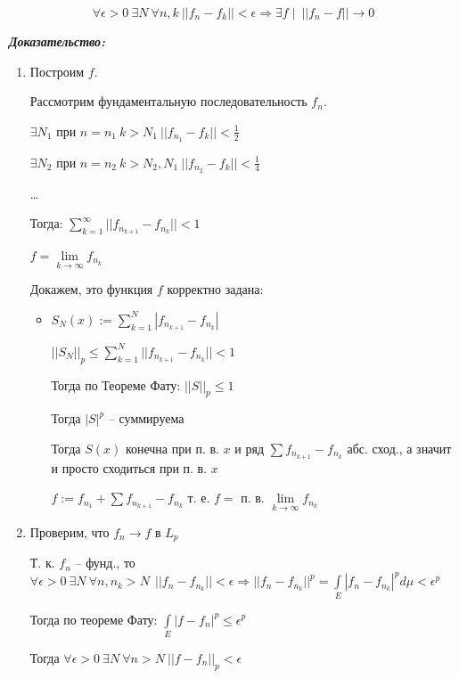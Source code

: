 \documentclass[paper=a4, fontsize=17pt]{article}
\begin{document}
$$ \forall \epsilon > 0 ~ \exists N ~ \forall n, k ~ ||f_n - f_k|| < \epsilon \Rightarrow \exists f \mid ~ ||f_n - f|| \rightarrow 0 $$


\textbf{\emph{Доказательство:}}

\begin{enumerate}
	\item Построим $ f $.

	Рассмотрим фундаментальную последовательность $ f_n $.

	$ \exists N_1 $ при $ n = n_1 ~ k > N_1 ~ ||f_{n_1} - f_k|| < \frac{1}{2}$

	$ \exists N_2 $ при $ n = n_2 ~ k > N_2, N_1 ~ ||f_{n_2} - f_k|| < \frac{1}{4}$

	\dots

	Тогда: $ \sum_{k = 1}^{\infty} || f_{n_{k+1}} - f_{n_k} || < 1$

	$ f = \lim\limits_{k \rightarrow \infty} f_{n_k}$

	Докажем, это функция $ f $ корректно задана:
	\begin{itemize}
		\item
		$ S_N (x) := \sum_{k = 1}^{N}|f_{n_{k+1}} - f_{n_k}|$

		$ ||S_N||_p \leq \sum_{k = 1}^{N} || f_{n_{k+1}} - f_{n_k} || < 1$

		Тогда по Теореме Фату: $ ||S||_p \leq 1 $

		Тогда $ |S|^p $ -- суммируема

		Тогда $ S(x) $ конечна при п. в. $ x $  и ряд $ \sum f_{n_{k + 1}} - f_{n_k} $ абс. сход., а значит  и просто сходиться при п. в. $ x $

		$ f:= f_{n_1} +  \sum f_{n_{k + 1}} - f_{n_k} $ т. е. $ f = $ п. в. $ \lim\limits_{k \rightarrow \infty} f_{n_k} $
	\end{itemize}

	\item Проверим, что $ f_n \rightarrow f $ в $ L_p $

	Т. к. $ f_n $ -- фунд., то $ \forall \epsilon > 0 ~ \exists N ~ \forall n, n_k > N ~ ~ ||f_n - f_{n_k} || < \epsilon \Rightarrow
	|| f_n  - f_{n_k} ||^p  = \int\limits_{E} |f_n  - f_{n_k}|^p d\mu < \epsilon^p $

	Тогда по теореме Фату: $ \int\limits_{E} |f - f_n|^p \leq \epsilon^p$

	Тогда $ \forall \epsilon > 0 ~ \exists N ~ \forall n > N ~ || f - f_n ||_p < \epsilon $


\end{enumerate}
\end{document}
